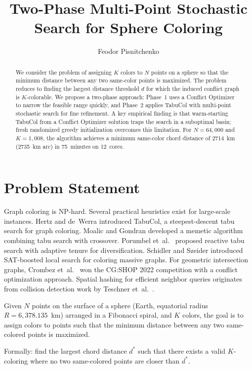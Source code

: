 \documentclass[11pt,a4paper]{article}
\title{Two-Phase Multi-Point Stochastic Search for Sphere Coloring}
\author{Feodor Pisnitchenko}
\date{}
\begin{document}
\maketitle

\begin{abstract}
We consider the problem of assigning $K$ colors to $N$ points on a sphere so that
the minimum distance between any two same-color points is maximized. The problem
reduces to finding the largest distance threshold $d$ for which the induced conflict
graph is $K$-colorable. We propose a two-phase approach: Phase~1 uses a Conflict
Optimizer to narrow the feasible range quickly, and Phase~2 applies TabuCol with
multi-point stochastic search for fine refinement. A key empirical finding is that
warm-starting TabuCol from a Conflict Optimizer solution traps the search in a
suboptimal basin; fresh randomized greedy initialization overcomes this limitation.
For $N = 64{,}000$ and $K = 1{,}008$, the algorithm achieves a minimum same-color
chord distance of 2714~km (2735~km arc) in 75~minutes on 12~cores.
\end{abstract}

\section{Problem Statement}

Graph coloring is NP-hard. Several practical heuristics exist for large-scale
instances. Hertz and de~Werra \cite{hertz1987} introduced TabuCol, a steepest-descent
tabu search for graph coloring. Moalic and Gondran \cite{moalic2018} developed a
memetic algorithm combining tabu search with crossover. Porumbel et~al.\
\cite{porumbel2010} proposed reactive tabu search with adaptive tenure for
diversification. Schidler and Szeider \cite{schidler2023} introduced SAT-boosted
local search for coloring massive graphs. For geometric intersection graphs,
Crombez et~al.\ \cite{crombez2023} won the CG:SHOP 2022 competition with a conflict
optimization approach. Spatial hashing for efficient neighbor queries
originates from collision detection work by Teschner et~al.\ \cite{teschner2003}.

Given $N$ points on the surface of a sphere (Earth, equatorial radius
$R = 6{,}378.135$~km) arranged in a Fibonacci spiral, and $K$ colors, the goal is to
assign colors to points such that the minimum distance between any two same-colored
points is maximized.

Formally: find the largest chord distance $d^*$ such that there exists a valid
$K$-coloring where no two same-colored points are closer than $d^*$.
\end{document}
